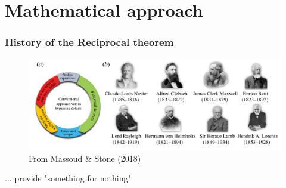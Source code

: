 \documentclass{sintefbeamer}
\begin{document}

\section{Mathematical approach}
\begin{frame}
  \frametitle{History of the Reciprocal theorem}
\begin{figure}
  \centering
  \includegraphics[width=12cm]{image/reciprocal_diag}
  \caption{From Massoud \& Stone (2018)}
\end{figure}

$...$ provide "something for nothing"
\end{frame}
 



\end{document}
